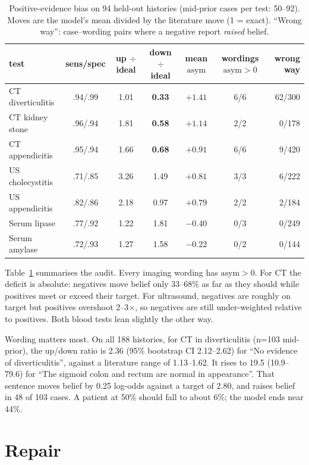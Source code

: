 \documentclass[10pt]{article}
\newcommand{\asym}{\mathrm{asym}}
\begin{document}
\begin{table}[t]
\centering\small
\caption{Positive-evidence bias on 94 held-out histories (mid-prior cases per test: 50--92). Moves are the model's mean divided by the literature move (1 = exact). ``Wrong way'': case--wording pairs where a negative report \emph{raised} belief.}
\label{tab:bias}
\setlength{\tabcolsep}{4pt}\footnotesize
\begin{tabular}{lcccccr}
\toprule
test & sens/spec & up $\div$ ideal & down $\div$ ideal & mean $\asym$ & wordings $\asym{>}0$ & wrong way \\
\midrule
CT diverticulitis & .94/.99 & 1.01 & \textbf{0.33} & $+1.41$ & 6/6 & 62/300 \\
CT kidney stone   & .96/.94 & 1.81 & \textbf{0.58} & $+1.14$ & 2/2 & 0/178 \\
CT appendicitis   & .95/.94 & 1.66 & \textbf{0.68} & $+0.91$ & 6/6 & 9/420 \\
US cholecystitis  & .71/.85 & 3.26 & 1.49 & $+0.81$ & 3/3 & 6/222 \\
US appendicitis   & .82/.86 & 2.18 & 0.97 & $+0.79$ & 2/2 & 2/184 \\
\midrule
Serum lipase      & .77/.92 & 1.22 & 1.81 & $-0.40$ & 0/3 & 0/249 \\
Serum amylase     & .72/.93 & 1.27 & 1.58 & $-0.22$ & 0/2 & 0/144 \\
\bottomrule
\end{tabular}
\end{table}

Table~\ref{tab:bias} summarises the audit. Every imaging wording has $\asym > 0$. For CT the deficit is absolute: negatives move belief only 33--68\% as far as they should while positives meet or exceed their target. For ultrasound, negatives are roughly on target but positives overshoot 2--3$\times$, so negatives are still under-weighted relative to positives. Both blood tests lean slightly the other way.

Wording matters most. On all 188 histories, for CT in diverticulitis (n=103 mid-prior), the up/down ratio is 2.36 (95\% bootstrap CI 2.12--2.62) for ``No evidence of diverticulitis'', against a literature range of 1.13--1.62. It rises to 19.5 (10.9--79.6) for ``The sigmoid colon and rectum are normal in appearance''. That sentence moves belief by 0.25 log-odds against a target of 2.80, and raises belief in 48 of 103 cases. A patient at 50\% should fall to about 6\%; the model ends near 44\%.

\section{Repair}\label{sec:repair}
\end{document}
